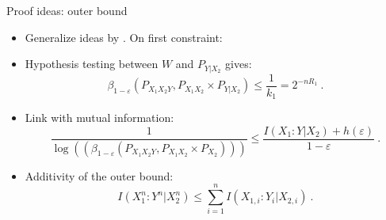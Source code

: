 \documentclass{beamer}
\theoremstyle{definition}
\theoremstyle{remark}
\begin{document}
\begin{frame}{Proof ideas: outer bound}
  \begin{itemize}
  \item Generalize ideas by \cite{Matthews12,PPV10}. On first constraint:
    \pause
    \bigskip
  \item Hypothesis testing between $W$ and $P_{Y|X_2}$ gives:
    \[ \beta_{1-\varepsilon}\left(P_{X_1X_2Y},P_{X_1X_2} \times P_{Y|X_2}\right) \leq \frac{1}{k_1} = 2^{-nR_1} \ .\]
    \pause
  \item Link with mutual information:
    \[ \frac{1}{\log\left(\left(\beta_{1-\varepsilon}\left(P_{X_1X_2Y},P_{X_1X_2} \times P_{X_2}\right)\right)\right)} \leq \frac{I(X_1:Y|X_2) + h(\varepsilon)}{1-\varepsilon} \ .\]
    \pause
  \item Additivity of the outer bound:
    \[ I(X_1^n:Y^n|X_2^n) \leq \sum_{i=1}^n I(X_{1,i}:Y_i|X_{2,i}) \ .\]
  \end{itemize}
\end{frame}
\end{document}
